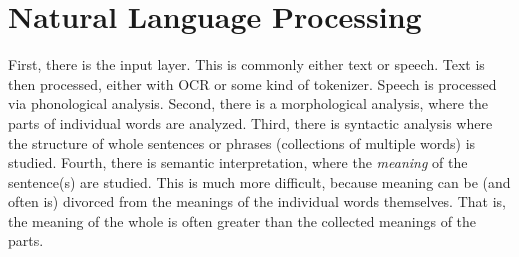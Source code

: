 \section{Natural Language Processing}\label{sec:nlp}

First, there is the input layer. This is commonly either text or speech. Text
is then processed, either with OCR or some kind of tokenizer. Speech is
processed via \gls{phonological} analysis. Second, there is a
\gls{morphological} analysis, where the parts of individual words are
analyzed. Third, there is \gls{syntactic} analysis where the structure of
whole sentences or phrases (collections of multiple words) is studied. Fourth,
there is \gls{semantic} interpretation, where the \textit{meaning} of the
sentence(s) are studied. This is much more difficult, because meaning can be
(and often is) divorced from the meanings of the individual words themselves.
That is, the meaning of the whole is often greater than the collected meanings
of the parts.
